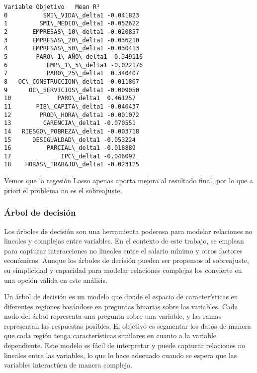 \documentclass[11pt]{article}
\begin{document}
    
    \begin{Verbatim}[commandchars=\\\{\}]
         Variable Objetivo   Mean R²
0          SMI\_VIDA\_delta1 -0.041823
1         SMI\_MEDIO\_delta1 -0.052622
2       EMPRESAS\_10\_delta1 -0.020857
3       EMPRESAS\_20\_delta1 -0.036210
4       EMPRESAS\_50\_delta1 -0.030413
5        PARO\_1\_AÑO\_delta1  0.349116
6           EMP\_1\_5\_delta1 -0.022176
7           PARO\_25\_delta1  0.340407
8   OC\_CONSTRUCCION\_delta1 -0.011867
9      OC\_SERVICIOS\_delta1 -0.009050
10             PARO\_delta1  0.461257
11       PIB\_CAPITA\_delta1 -0.046437
12        PROD\_HORA\_delta1 -0.001072
13         CARENCIA\_delta1 -0.070551
14   RIESGO\_POBREZA\_delta1 -0.003718
15      DESIGUALDAD\_delta1 -0.053224
16          PARCIAL\_delta1 -0.018889
17              IPC\_delta1 -0.046092
18    HORAS\_TRABAJO\_delta1 -0.023125
    \end{Verbatim}

    
    Vemos que la regesión Lasso apenas aporta mejora al resultado final, por
lo que a priori el problema no es el sobreajuste.

    \subsubsection{Árbol de decisión}\label{uxe1rbol-de-decisiuxf3n}

Los árboles de decisión son una herramienta poderosa para modelar
relaciones no lineales y complejas entre variables. En el contexto de
este trabajo, se emplean para capturar interacciones no lineales entre
el salario mínimo y otros factores económicos. Aunque los árboles de
decisión pueden ser propensos al sobreajuste, su simplicidad y capacidad
para modelar relaciones complejas los convierte en una opción válida en
este análisis.

Un árbol de decisión es un modelo que divide el espacio de
características en diferentes regiones basándose en preguntas binarias
sobre las variables. Cada nodo del árbol representa una pregunta sobre
una variable, y las ramas representan las respuestas posibles. El
objetivo es segmentar los datos de manera que cada región tenga
características similares en cuanto a la variable dependiente. Este
modelo es fácil de interpretar y puede capturar relaciones no lineales
entre las variables, lo que lo hace adecuado cuando se espera que las
variables interactúen de manera compleja.
\end{document}
